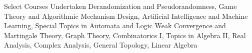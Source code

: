 \begin{rubric}{Select Courses Undertaken}
		Derandomization and Pseudorandomness, Game Theory and Algorithmic Mechanism Design, Artificial Intelligence and Machine Learning, Special Topics in Automata and Logic%
	\entry*[Mathematics]
		Weak Convergence and Martingale Theory, Graph Theory, Combinatorics I, Topics in Algebra II, Real Analysis, Complex Analysis, General Topology, Linear Algebra
\end{rubric}